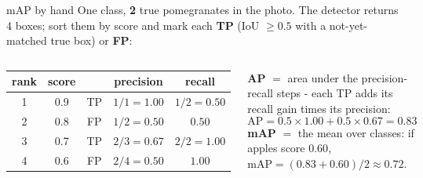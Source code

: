 \documentclass[aspectratio=169]{beamer}
\begin{document}
\begin{frame}{mAP by hand}
  \small
  One class, \textbf{2} true pomegranates in the photo. The detector returns 4 boxes;
  sort them by score and mark each \textbf{TP} (IoU $\ge 0.5$ with a not-yet-matched true
  box) or \textbf{FP}:
  \vskip 4pt
  \begin{columns}[T]
    \begin{center}\footnotesize
      \begin{tabular}{c c c c c}
        \textbf{rank} & \textbf{score} & & \textbf{precision} & \textbf{recall}\\
        \hline
        1 & 0.9 & TP & $1/1 = 1.00$ & $1/2 = 0.50$\\
        2 & 0.8 & FP & $1/2 = 0.50$ & $0.50$\\
        3 & 0.7 & TP & $2/3 = 0.67$ & $2/2 = 1.00$\\
        4 & 0.6 & FP & $2/4 = 0.50$ & $1.00$\\
      \end{tabular}
    \end{center}
    \textbf{AP} $=$ area under the precision-recall steps - each TP adds its recall gain
    times its precision:
    \[
      \text{AP} = 0.5 \times 1.00 + 0.5 \times 0.67 = \mathbf{0.83}
    \]
    \textbf{mAP} $=$ the mean over classes: if apples score $0.60$,
    $\text{mAP} = (0.83 + 0.60)/2 \approx 0.72$.
  \end{columns}
  \vskip 6pt
\end{frame}
\end{document}
